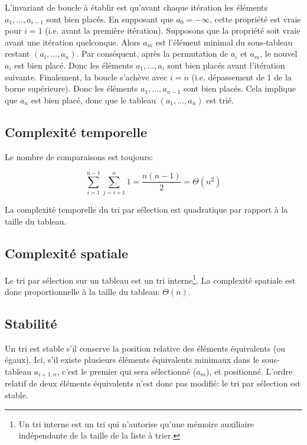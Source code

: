 \documentclass[11pt,a4paper]{article}
\begin{document}
      L'invariant de boucle à établir est qu'avant chaque itération
      les éléments $a_1, \ldots, a_{i-1}$ sont bien placés. En
      supposant que $a_0 = -\infty$, cette propriété est vraie pour
      $i=1$ (i.e. avant la première itération). Supposons que la
      propriété soit vraie avant une itération quelconque. Alors $a_m$
      est l'élément minimal du sous-tableau restant $(a_i, \ldots,
      a_n)$. Par conséquent, après la permutation de $a_i$ et $a_m$,
      le nouvel $a_i$ est bien placé. Donc les éléments $a_1, \ldots,
      a_i$ sont bien placés avant l'itération suivante. Finalement, la
      boucle s'achève avec $i = n$ (i.e. dépassement de 1 de la borne
      supérieure). Donc les éléments $a_1, \ldots, a_{n-1}$ sont bien
      placés. Cela implique que $a_n$ est bien placé, donc que le
      tableau $(a_1, \ldots, a_n)$ est trié.

    \subsection{Complexité temporelle}

      \noindent
      Le nombre de comparaisons est toujours:

      $$\sum_{i=1}^{n-1}{\sum_{j=i+1}^{n}{1}} = \frac{n (n-1)}{2} =
        \Theta (n^2)$$

      \noindent
      La complexité temporelle du tri par sélection est quadratique
      par rapport à la taille du tableau.

    \subsection{Complexité spatiale}

      Le tri par sélection sur un tableau est un tri interne\footnote{
      Un tri interne est un tri qui n'autorise qu'une mémoire
      auxiliaire indépendante de la taille de la liste à trier.}. La
      complexité spatiale est donc proportionnelle à la taille du
      tableau: $\Theta (n)$.

    \subsection{Stabilité}

      Un tri est stable s'il conserve la position relative des
      éléments équivalents (ou égaux). Ici, s'il existe plusieurs
      éléments équivalents minimaux dans le sous-tableau $a_{i+1,n}$,
      c'est le premier qui sera sélectionné ($a_m$), et
      positionné. L'ordre relatif de deux éléments équivalents n'est
      donc pas modifié: le tri par sélection est stable.
\end{document}
